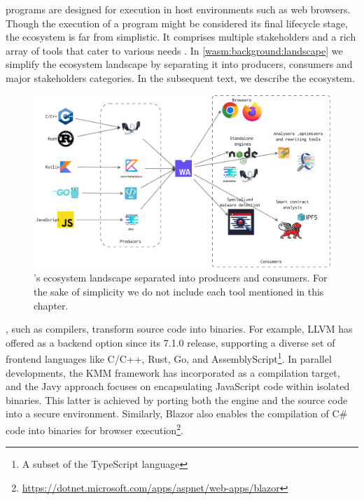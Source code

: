 \Wasm programs are designed for execution in host environments such as web browsers.
Though the execution of a \Wasm program might be considered its final lifecycle stage, the \Wasm ecosystem is far from simplistic.
It comprises multiple stakeholders and a rich array of tools that cater to various needs \cite{Avenger}.
In \autoref{wasm:background:landscape} we simplify the ecosystem landscape by separating it into producers, consumers and major stakeholders categories.
In the subsequent text, we describe the \Wasm ecosystem.

\begin{figure}
    \centering
    \includegraphics[width=1.0\linewidth]{figures/landscape2.pdf}
    \caption{\Wasm's ecosystem landscape separated into producers and consumers. For the sake of simplicity we do not include each tool mentioned in this chapter.}
    \label{wasm:background:landscape}
\end{figure}

, such as compilers, transform source code into \Wasm binaries. 
For example, LLVM has offered \Wasm as a backend option since its 7.1.0 release, supporting a diverse set of frontend languages like C/C++, Rust, Go, and AssemblyScript\footnote{A subset of the TypeScript language}.
In parallel developments, the KMM framework has incorporated \Wasm as a compilation target, and the Javy approach focuses on encapsulating JavaScript code within isolated \Wasm binaries. 
This latter is achieved by porting both the engine and the source code into a secure \Wasm environment. 
Similarly, Blazor also enables the compilation of C# code into \Wasm binaries for browser execution\footnote{\url{https://dotnet.microsoft.com/apps/aspnet/web-apps/blazor}}.

